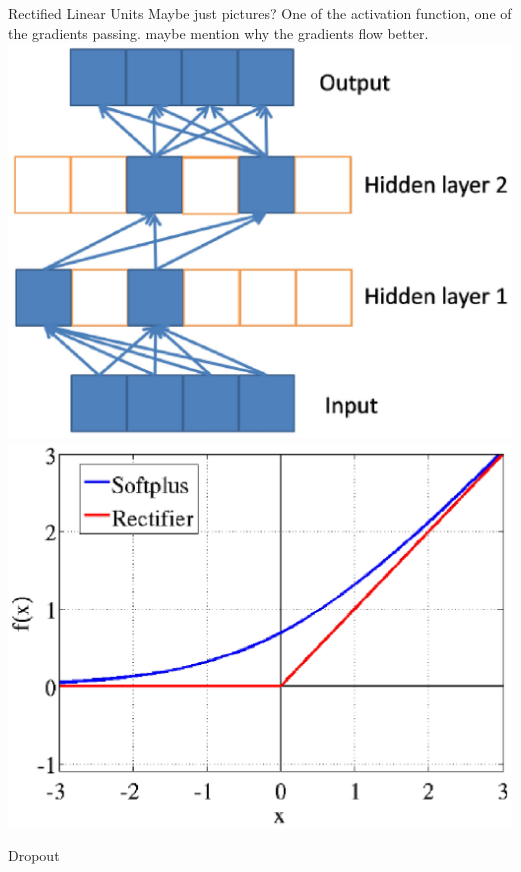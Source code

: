 \documentclass{beamer}
\begin{document}
\begin{frame}{Rectified Linear Units}
Maybe just pictures? One of the activation function, one of the gradients passing. maybe mention why the gradients flow better. 
\includegraphics[scale=0.3]{Figures/ReLU-grads.eps}
\includegraphics[scale=0.3]{Figures/ReLU-acts.eps}
\end{frame}

\begin{frame}{Dropout}
\end{frame}
\end{document}
